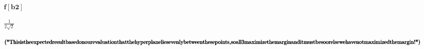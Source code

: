 \documentclass{article}
\begin{document}
\begin{doublespace}
\noindent\(\pmb{f[\text{b2}]}\)
\end{doublespace}

\begin{doublespace}
\noindent\(\frac{1}{2 \sqrt{2}}\)
\end{doublespace}

\begin{doublespace}
\noindent\(\pmb{\text{(*} \text{This} \text{is} \text{the} \text{expected} \text{result} \text{based} \text{on} \text{our} \text{evaluation} \text{that}
\text{the} \text{hyperplane} }\\
\pmb{\text{lies} \text{evenly} \text{between} \text{these} \text{points}, }\\
\pmb{\text{so} \text{all} 3 \text{maximize} \text{the} \text{margin} \text{and} \text{it} \text{must} \text{be} \text{so} \text{or} \text{else} \text{we}
\text{have} \text{not} \text{maximized} }\\
\pmb{\text{the} \text{margin}! \text{*)}}\)
\end{doublespace}
\end{document}
